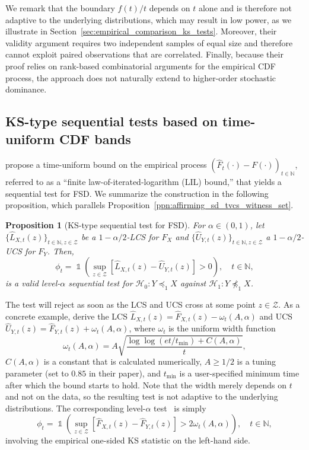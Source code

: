 \documentclass[12pt,twoside]{article}
\theoremstyle{plain}
\newtheorem{proposition}{Proposition}
\theoremstyle{definition}
\theoremstyle{remark}
\newcommand{\inparen}[1]{\left(#1\right)}
\newcommand{\insquare}[1]{\left[#1\right]}
\DeclareMathOperator*{\indsymb}{\mathds{1}}
\newcommand{\indicator}[1]{\indsymb\inparen{#1}}
\newcommand{\N}{\mathbb{N}}
\newcommand{\calH}{\mathcal{H}}
\newcommand{\calZ}{\mathcal{Z}}
\newcommand{\fsd}{\preceq_{1}}
\newcommand{\notfsd}{\npreceq_{1}}
\begin{document}
We remark that the boundary $f(t)/t$ depends on $t$ alone and is therefore not adaptive to the underlying distributions, which may result in low power, as we illustrate in Section~\ref{sec:empirical_comparison_ks_tests}. Moreover, their validity argument requires two independent samples of equal size and therefore cannot exploit paired observations that are correlated. Finally, because their proof relies on rank-based combinatorial arguments for the empirical CDF process, the approach does not naturally extend to higher-order stochastic dominance.


\subsection{KS-type sequential tests based on time-uniform CDF bands}\label{sec:general_ks_test_from_tvcs}

\citet[][Appendix B.2]{howard2022sequential} propose a time-uniform bound on the empirical process $(\hat{F}_t(\cdot) - F(\cdot))_{t\in \N}$, referred to as a ``finite law-of-iterated-logarithm (LIL) bound,'' that yields a sequential test for FSD. 
We summarize the construction in the following proposition, which parallels Proposition~\ref{ppn:affirming_sd_tvcs_witness_set}.

\begin{proposition}[KS-type sequential test for FSD]\label{ppn:testing_sd_from_tvcs}
    For $\alpha \in (0,1)$,
let $\{\hat{L}_{X,t}(z)\}_{t \in \N, z \in \calZ}$ be a $1-\alpha/2$-LCS for $F_X$ and $\{\hat{U}_{Y,t}(z)\}_{t \in \N, z \in \calZ}$ a $1-\alpha/2$-UCS for $F_Y$.
    Then,
    \begin{equation*}
        \phi_t = \indicator{ \sup_{z \in \calZ} \insquare{\hat{L}_{X,t}(z) - \hat{U}_{Y,t}(z)} > 0} , \quad t\in \N,
    \end{equation*}
    is a valid level-$\alpha$ sequential test for $\calH_0: Y \fsd X$ against $\calH_1: Y \notfsd X$. 
\end{proposition}
The test will reject as soon as the LCS and UCS cross at some point $z \in \calZ$. 
As a concrete example, \citet[][Theorem 2]{howard2022sequential} derive the LCS $\hat{L}_{X,t}(z) = \hat{F}_{X,t}(z) - \omega_t(A, \alpha)$ and UCS $\hat{U}_{Y,t}(z) = \hat{F}_{Y,t}(z) + \omega_t(A, \alpha)$, where $\omega_t$ is the uniform width function
\begin{equation*}
    \omega_t(A, \alpha) = A\sqrt{\frac{\log\log(et/t_{\text{min}}) + C(A, \alpha)}{t}}, 
\end{equation*}
$C(A, \alpha)$ is a constant that is calculated numerically, $A \geq 1/2$ is a tuning parameter (set to $0.85$ in their paper), and $t_{\text{min}}$ is a user-specified minimum time after which the bound starts to hold.
Note that the width merely depends on $t$ and not on the data, so the resulting test is not adaptive to the underlying distributions. 
The corresponding level-$\alpha$ test~\citep{darling1968some} is simply
\begin{equation*}
    \phi_t = \indicator{\sup_{z \in \calZ} \insquare{\hat{F}_{X,t}(z) - \hat{F}_{Y,t}(z)} > 2\omega_t(A, \alpha)}, \quad t\in \N,
\end{equation*}
involving the empirical one-sided KS statistic on the left-hand side. 
\end{document}
